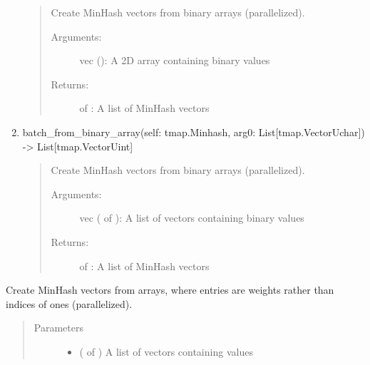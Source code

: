 \documentclass[letterpaper,10pt,english]{sphinxmanual}
\begin{document}
\begin{fulllineitems}
\begin{fulllineitems}
\begin{enumerate}
\begin{quote}
Create MinHash vectors from binary arrays (parallelized).
\begin{description}
\item[{Arguments:}] \leavevmode
vec (): A 2D array containing binary values

\item[{Returns:}] \leavevmode
{} of : A list of MinHash vectors

\end{description}
\end{quote}

\item {} 
batch\_from\_binary\_array(self: tmap.Minhash, arg0: List{[}tmap.VectorUchar{]}) -\textgreater{} List{[}tmap.VectorUint{]}
\begin{quote}

Create MinHash vectors from binary arrays (parallelized).
\begin{description}
\item[{Arguments:}] \leavevmode
vec ( of ): A list of vectors containing binary values

\item[{Returns:}] \leavevmode
{} of : A list of MinHash vectors

\end{description}
\end{quote}

\end{enumerate}

\end{fulllineitems}


\begin{fulllineitems}
\label{\detokenize{documentation:tmap.Minhash.batch_from_int_weight_array}}
Create MinHash vectors from  arrays, where entries are weights rather than indices of ones (parallelized).
\begin{quote}\begin{description}
\item[{Parameters}] \leavevmode\begin{itemize}
\item {} 
 ( of ) \textendash{} A list of vectors containing  values


\end{itemize}
\end{description}
\end{quote}
\end{fulllineitems}
\end{fulllineitems}
\end{document}
